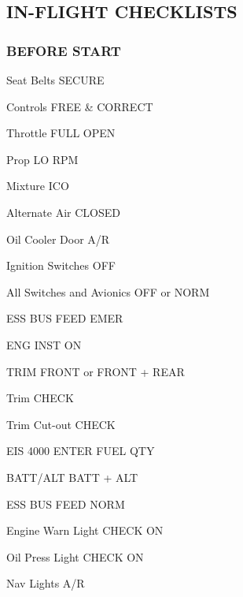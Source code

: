 \begin{multicols}{2}
\raggedcolumns
\subsection*{IN-FLIGHT CHECKLISTS}

\subsubsection*{BEFORE START}
\begin{enumerate*}
\item Seat Belts \dotfill SECURE
\item Controls \dotfill FREE \& CORRECT
\item Throttle \dotfill FULL OPEN
\item Prop \dotfill LO RPM
\item Mixture \dotfill ICO
\item Alternate Air \dotfill CLOSED
\item Oil Cooler Door \dotfill A/R
\item Ignition Switches \dotfill OFF
\item All Switches and Avionics \dotfill OFF or NORM
\item ESS BUS FEED \dotfill EMER
\item ENG INST \dotfill ON
\item TRIM \dotfill FRONT or FRONT + REAR
\item Trim \dotfill CHECK
\item Trim Cut-out \dotfill CHECK
\item EIS 4000 \dotfill ENTER FUEL QTY
\item BATT/ALT \dotfill BATT + ALT
\item ESS BUS FEED \dotfill NORM
\item Engine Warn Light \dotfill CHECK ON
\item Oil Press Light \dotfill CHECK ON
\item Nav Lights \dotfill A/R
\end{enumerate*}


\end{multicols}
